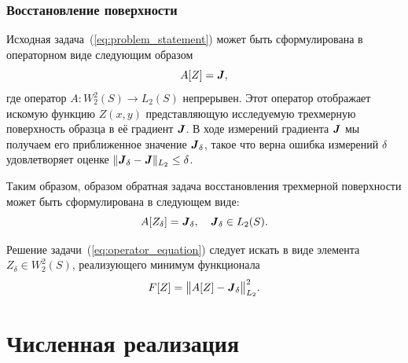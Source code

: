 \documentclass{beamer}
\begin{document}
\begin{frame}[c,allowframebreaks]
    \frametitle{Восстановление поверхности}

    Исходная задача~(\ref{eq:problem_statement}) может быть сформулирована в операторном виде следующим образом
    \begin{equation*}
        \label{operator_equation_0}
        A[Z] = {\textbf{\emph{J}}},
    \end{equation*}
где оператор $A: W_2^2(S) \to L_2(S)$ непрерывен. Этот оператор отображает искомую функцию $Z(x,y)$
представляющую исследуемую трехмерную поверхность образца в её градиент ${\textbf{\emph{J}}}$.
В ходе измерений градиента ${\textbf{\emph{J}}}$ мы получаем его приближенное значение
$\textbf{\emph{J}}_\delta$, такое что верна ошибка измерений $\delta$ удовлетворяет оценке
$\|{\textbf{\emph{J}}}_\delta - {{\textbf{\emph{J}}}}\|_{L_2}\leq\delta$.

    \framebreak

    Таким образом, образом обратная задача восстановления трехмерной поверхности может быть
    сформулирована в следующем виде:
    \begin{equation}
        \label{eq:operator_equation}
        A[Z_\delta] = {\textbf{\emph{J}}}_\delta, \quad {\textbf{\emph{J}}}_\delta \in L_2(S).
    \end{equation}

    Решение задачи~(\ref{eq:operator_equation}) следует искать в виде элемента $Z_\delta \in W_2^2(S)$,
    реализующего минимум функционала
    \begin{equation}
        \label{functional}
        F[Z] = \big\|A[Z] - {\textbf{\emph{J}}}_\delta\big\|_{L_2}^2.
    \end{equation}
\end{frame}




\section{Численная реализация}
\begin{frame}
    \sectionpage
\end{frame}
\end{document}

